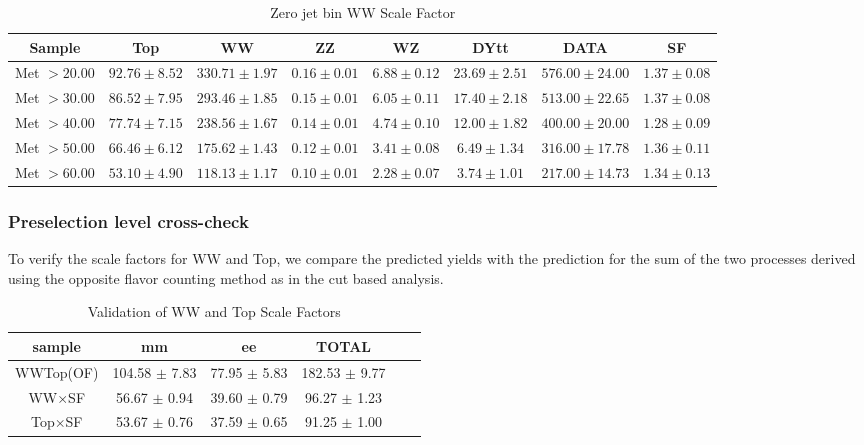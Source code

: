 \begin{table}[!ht]
\begin{center}
 \tiny{
\begin{tabular}{c|c|c|c|c|c|c|c}
\hline
Sample & Top & WW & ZZ & WZ & DYtt & DATA & SF \\ \hline
Met $> 20.00$ & $92.76 \pm 8.52$ & $330.71 \pm 1.97$ & $0.16 \pm 0.01$ & $6.88 \pm 0.12$ & $23.69 \pm 2.51$ & $576.00 \pm 24.00$ & $1.37 \pm 0.08$ \\ \hline
Met $> 30.00$ & $86.52 \pm 7.95$ & $293.46 \pm 1.85$ & $0.15 \pm 0.01$ & $6.05 \pm 0.11$ & $17.40 \pm 2.18$ & $513.00 \pm 22.65$ & $1.37 \pm 0.08$ \\ \hline
Met $> 40.00$ & $77.74 \pm 7.15$ & $238.56 \pm 1.67$ & $0.14 \pm 0.01$ & $4.74 \pm 0.10$ & $12.00 \pm 1.82$ & $400.00 \pm 20.00$ & $1.28 \pm 0.09$ \\ \hline
Met $> 50.00$ & $66.46 \pm 6.12$ & $175.62 \pm 1.43$ & $0.12 \pm 0.01$ & $3.41 \pm 0.08$ & $6.49 \pm 1.34$ & $316.00 \pm 17.78$ & $1.36 \pm 0.11$ \\ \hline
Met $> 60.00$ & $53.10 \pm 4.90$ & $118.13 \pm 1.17$ & $0.10 \pm 0.01$ & $2.28 \pm 0.07$ & $3.74 \pm 1.01$ & $217.00 \pm 14.73$ & $1.34 \pm 0.13$ \\ \hline
\end{tabular}
\caption{Zero jet bin WW Scale Factor}
\label{tab:yield_of_0jet_wwsf}}
\end{center}
\end{table}

\subsubsection{Preselection level cross-check}

To verify the scale factors for WW and Top, we compare the predicted yields with the prediction
for the sum of the two processes derived using the opposite flavor counting method
as in the cut based analysis.

\begin{table}[!ht]
\begin{center}
\begin{tabular}{c|c|c|c|c|c}
sample  & mm    & ee     & TOTAL\\ \hline 
WWTop(OF)   & 104.58 $\pm$ 7.83 & 77.95 $\pm$ 5.83  & 182.53 $\pm$ 9.77 \\ \hline 
WW$\times$SF  & 56.67 $\pm$ 0.94  & 39.60 $\pm$ 0.79  & 96.27 $\pm$ 1.23 \\ \hline 
Top$\times$SF & 53.67 $\pm$ 0.76  & 37.59 $\pm$ 0.65  & 91.25 $\pm$ 1.00 \\ \hline 
\end{tabular}
\caption{Validation of WW and Top Scale Factors}
\label{tab:yield_presel_ofsfval}
\end{center}
\end{table}

